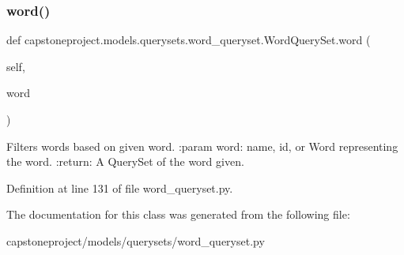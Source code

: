 \mbox{\label{classcapstoneproject_1_1models_1_1querysets_1_1word__queryset_1_1_word_query_set_a65420de07adbc0ce15fb220b307c2dbc}} 
\subsubsection{\texorpdfstring{word()}{word()}}
{\footnotesize\ttfamily def capstoneproject.\+models.\+querysets.\+word\+\_\+queryset.\+Word\+Query\+Set.\+word (\begin{DoxyParamCaption}\item[{}]{self,  }\item[{}]{word }\end{DoxyParamCaption})}

\begin{DoxyVerb}Filters words based on given word.
:param word: name, id, or Word representing the word.
:return: A QuerySet of the word given.
\end{DoxyVerb}
 

Definition at line 131 of file word\+\_\+queryset.\+py.



The documentation for this class was generated from the following file\+:\begin{DoxyCompactItemize}
\item 
capstoneproject/models/querysets/word\+\_\+queryset.\+py\end{DoxyCompactItemize}
